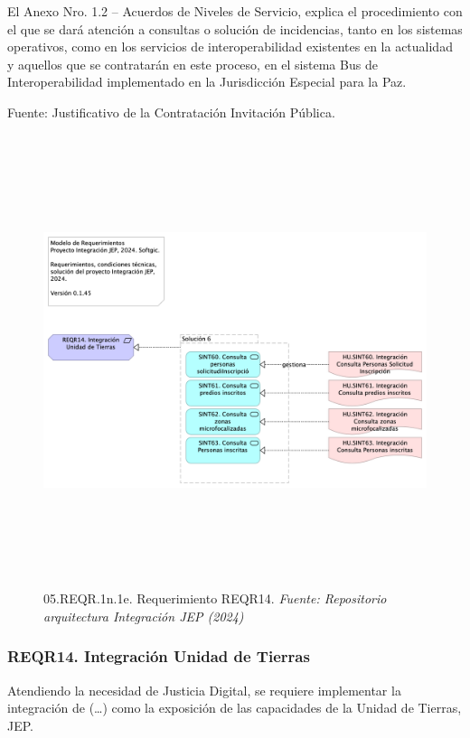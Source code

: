 \documentclass[
  paper=a4,
  ,captions=tableheading
]{scrartcl}
\begin{document}
El Anexo Nro. 1.2 -- Acuerdos de Niveles de Servicio, explica el
procedimiento con el que se dará atención a consultas o solución de
incidencias, tanto en los sistemas operativos, como en los servicios de
interoperabilidad existentes en la actualidad y aquellos que se
contratarán en este proceso, en el sistema Bus de Interoperabilidad
implementado en la Jurisdicción Especial para la Paz.

Fuente: Justificativo de la Contratación Invitación Pública.

\begin{figure}
\centering
\includegraphics[width=\textwidth,height=5.20833in]{images/05.REQR.1n.1e.RequerimientoREQR14.png}
\caption{05.REQR.1n.1e. Requerimiento REQR14. \emph{Fuente: Repositorio
arquitectura Integración JEP
(2024)}}\label{fig:id-8773bfeac4cd41baabad95263807db04}
\end{figure}

\subsubsection{REQR14. Integración Unidad de
Tierras}\label{sec:reqr14.-integraciuxf3n-unidad-de-tierras}

Atendiendo la necesidad de Justicia Digital, se requiere implementar la
integración de (\ldots) como la exposición de las capacidades de la
Unidad de Tierras, JEP.
\end{document}
